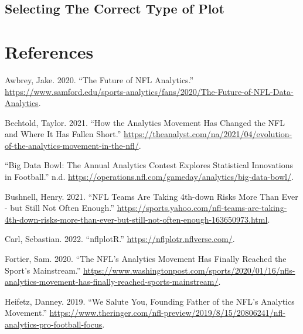 \documentclass[
  letterpaper,
]{krantz}
\newlength{\cslhangindent}
\newlength{\cslentryspacingunit} %
\newenvironment{CSLReferences}[2] %
 {%
  \setlength{\parindent}{0pt}
  \ifodd #1
  \let\oldpar\par
  \def\par{\hangindent=\cslhangindent\oldpar}
  \fi
  \setlength{\parskip}{#2\cslentryspacingunit}
 }%
 {}
\begin{document}
\hypertarget{selecting-the-correct-type-of-plot}{%
\section{Selecting The Correct Type of
Plot}\label{selecting-the-correct-type-of-plot}}


\hypertarget{references}{%
\chapter*{References}\label{references}}

\hypertarget{refs}{}
\begin{CSLReferences}{1}{0}
\leavevmode{}%
Awbrey, Jake. 2020. {``The Future of NFL Analytics.''}
\url{https://www.samford.edu/sports-analytics/fans/2020/The-Future-of-NFL-Data-Analytics}.

\leavevmode{}%
Bechtold, Taylor. 2021. {``How the Analytics Movement Has Changed the
NFL and Where It Has Fallen Short.''}
\url{https://theanalyst.com/na/2021/04/evolution-of-the-analytics-movement-in-the-nfl/}.

\leavevmode{}%
{``Big Data Bowl: The Annual Analytics Contest Explores Statistical
Innovations in Football.''} n.d.
\url{https://operations.nfl.com/gameday/analytics/big-data-bowl/}.

\leavevmode{}%
Bushnell, Henry. 2021. {``NFL Teams Are Taking 4th-down Risks More Than
Ever - but Still Not Often Enough.''}
\url{https://sports.yahoo.com/nfl-teams-are-taking-4th-down-risks-more-than-ever-but-still-not-often-enough-163650973.html}.

\leavevmode{}%
Carl, Sebastian. 2022. {``nflplotR.''}
\url{https://nflplotr.nflverse.com/}.

\leavevmode{}%
Fortier, Sam. 2020. {``The NFL's Analytics Movement Has Finally Reached
the Sport's Mainstream.''}
\url{https://www.washingtonpost.com/sports/2020/01/16/nfls-analytics-movement-has-finally-reached-sports-mainstream/}.

\leavevmode{}%
Heifetz, Danney. 2019. {``We Salute You, Founding Father of the NFL's
Analytics Movement.''}
\url{https://www.theringer.com/nfl-preview/2019/8/15/20806241/nfl-analytics-pro-football-focus}.


\end{CSLReferences}
\end{document}
